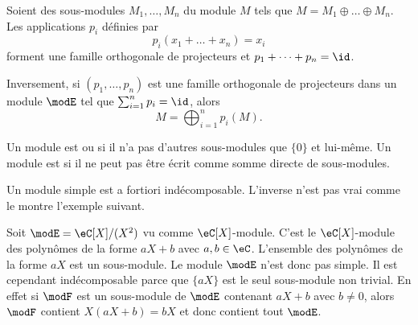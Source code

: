 \begin{theorem}     \label{ThoProjModpAlsUR}
	Soient des sous-modules \( M_1,\ldots,M_n\) du module \( M \) tels que \( M=M_1\oplus\ldots\oplus M_n\). Les applications \( p_i\) définies par
	\begin{equation}
		p_i(x_1+\ldots+x_n)=x_i
	\end{equation}
	forment une famille orthogonale de projecteurs et \( p_1+\cdots +p_n=\id\).

	Inversement, si \( (p_1,\ldots, p_n)\) est une famille orthogonale de projecteurs dans un module \( \modE\) tel que \( \sum_{i=1}^np_i=\id\), alors
	\begin{equation}
		M=\bigoplus_{i=1}^np_i(M).
	\end{equation}
\end{theorem}

\begin{definition}
	Un module est  ou  si il n'a pas d'autres sous-modules que \( \{ 0 \}\) et lui-même. Un module est  si il ne peut pas être écrit comme somme directe de sous-modules.
\end{definition}

Un module simple est a fortiori indécomposable. L'inverse n'est pas vrai comme le montre l'exemple suivant.

\begin{example}
	Soit \( \modE=\eC[X]/(X^2)\) vu comme \( \eC[X]\)-module. C'est le \( \eC[X]\)-module des polynômes de la forme \( aX+b\) avec \( a,b\in \eC\). L'ensemble des polynômes de la forme \( aX\) est un sous-module. Le module \( \modE\) n'est donc pas simple. Il est cependant indécomposable parce que \( \{ aX \}\) est le seul sous-module non trivial. En effet si \( \modF\) est un sous-module de \( \modE\) contenant \( aX+b\) avec \( b\neq 0\), alors \( \modF\) contient \( X(aX+b)=bX\) et donc contient tout \( \modE\).
\end{example}

